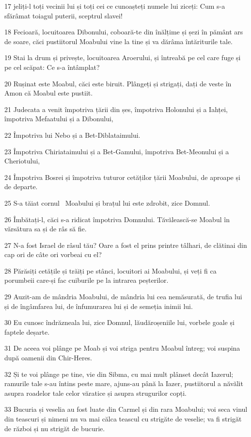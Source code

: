 \par 17 jeliți-l toți vecinii lui și toți cei ce cunoașteți numele lui ziceți: Cum s-a sfărâmat toiagul puterii, sceptrul slavei!
\par 18 Fecioară, locuitoarea Dibonului, coboară-te din înălțime și șezi în pământ ars de soare, căci pustiitorul Moabului vine la tine și va dărâma întăriturile tale.
\par 19 Stai la drum și privește, locuitoarea Aroerului, și întreabă pe cel care fuge și pe cel scăpat: Ce s-a întâmplat?
\par 20 Rușinat este Moabul, căci este biruit. Plângeți și strigați, dați de veste în Amon că Moabul este pustiit.
\par 21 Judecata a venit împotriva țării din șes, împotriva Holonului și a Iahței, împotriva Mefaatului și a Dibonului,
\par 22 Împotriva lui Nebo și a Bet-Diblataimului.
\par 23 Împotriva Chiriataimului și a Bet-Gamului, împotriva Bet-Meonului și a Cheriotului,
\par 24 Împotriva Bosrei și împotriva tuturor cetăților țării Moabului, de aproape și de departe.
\par 25 S-a tăiat cornul  Moabului și brațul lui este zdrobit, zice Domnul.
\par 26 Îmbătați-l, căci s-a ridicat împotriva Domnului. Tăvălească-se Moabul în vărsătura sa și de râs să fie.
\par 27 N-a fost Israel de râsul tău? Oare a fost el prins printre tâlhari, de clătinai din cap ori de câte ori vorbeai cu el?
\par 28 Părăsiți cetățile și trăiți pe stânci, locuitori ai Moabului, și veți fi ca porumbeii care-și fac cuiburile pe la intrarea peșterilor.
\par 29 Auzit-am de mândria Moabului, de mândria lui cea nemăsurată, de trufia lui și de îngâmfarea lui, de înfumurarea lui și de semeția inimii lui.
\par 30 Eu cunosc îndrăzneala lui, zice Domnul, lăudăroșeniile lui, vorbele goale și faptele deșarte.
\par 31 De aceea voi plânge pe Moab și voi striga pentru Moabul întreg; voi suspina după oamenii din Chir-Heres.
\par 32 Și te voi plânge pe tine, vie din Sibma, cu mai mult plânset decât Iazerul; ramurile tale s-au întins peste mare, ajuns-au până la Iazer, pustiitorul a năvălit asupra roadelor tale celor văratice și asupra strugurilor copți.
\par 33 Bucuria și veselia au fost luate din Carmel și din rara Moabului; voi seca vinul din teascuri și nimeni nu va mai călca teascul cu strigăte de veselie; va fi strigăt de război și nu strigăt de bucurie.
